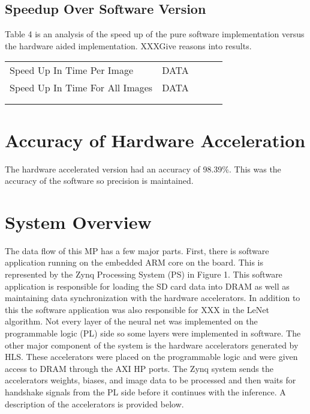\documentclass[letterpaper, 10 pt, conference]{IEEEconf}  %
\begin{document}
\subsection{Speedup Over Software Version}
Table 4 is an analysis  of the speed up of the pure software implementation versus the hardware aided implementation. XXXGive reasons into results.

\begin{table}[H]
\begin{center}
\begin{tabular}{lllll}
\cline{1-2}
\multicolumn{1}{|l|}{Speed Up  In Time Per Image}     & \multicolumn{1}{l|}{DATA} &  &  &  \\ \cline{1-2}
\multicolumn{1}{|l|}{Speed Up In Time For All Images} & \multicolumn{1}{l|}{DATA} &  &  &  \\ \cline{1-2}
                                                      &                       &  &  &  \\
                                                      &                       &  &  & 
\end{tabular}
\end{center}
\end{table}

\section{Accuracy of Hardware Acceleration}
The hardware accelerated version had an accuracy of 98.39\%.  This was the accuracy of the software so precision is maintained. 


\section{System Overview}
The data flow of this MP has a few major parts. First, there is software application running on the embedded ARM core on the board. This is represented by the Zynq Processing System (PS) in Figure 1.  This software application is responsible for loading the SD card data into DRAM as well as maintaining data synchronization with the hardware accelerators. In addition to this the software application was also responsible for XXX in the LeNet algorithm. Not every layer of the neural net was implemented on the programmable logic (PL) side so some layers were implemented in software. The other major component of the system is the hardware accelerators generated by HLS. These accelerators were placed on the programmable logic and were given access to DRAM through the AXI HP ports. The Zynq system sends the accelerators weights, biases, and image data to be processed and then waits for handshake signals from the PL side before it continues with the inference. A description of the accelerators is provided below. 
\end{document}
